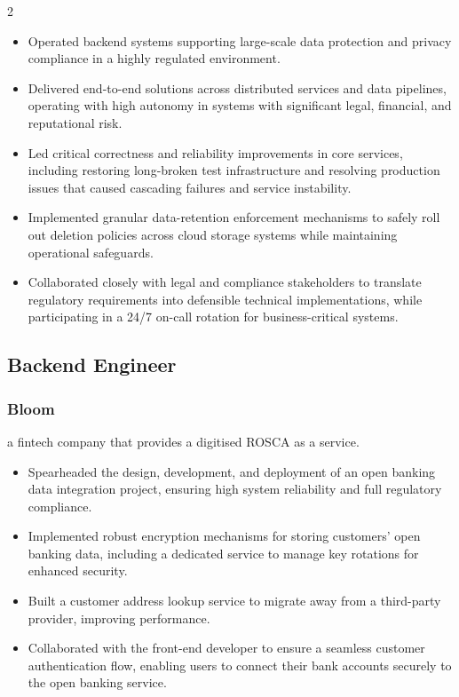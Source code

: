 \documentclass{article}
\begin{document}
\begin{paracol}{2}
  \begin{itemize}[leftmargin=*]
    \setlength\itemsep{-2pt}
    \item Operated backend systems supporting large-scale data protection and privacy compliance in a highly regulated environment.
    \item Delivered end-to-end solutions across distributed services and data pipelines, operating with high autonomy in systems with significant legal, financial, and reputational risk.
    \item Led critical correctness and reliability improvements in core services, including restoring long-broken test infrastructure and resolving production issues that caused cascading failures and service instability.
    \item Implemented granular data-retention enforcement mechanisms to safely roll out deletion policies across cloud storage systems while maintaining operational safeguards.
    \item Collaborated closely with legal and compliance stakeholders to translate regulatory requirements into defensible technical implementations, while participating in a 24/7 on-call rotation for business-critical systems.
  \end{itemize}

  \subsection{Backend Engineer}
  \subsubsection{Bloom}
  {\color{LightGrey}\scriptsize\href{https://www.bloommoney.co}{\faExternalLink}}
  \hspace*{\fill}{\color{TitleGrey}{\scriptsize\faCalendar}\hspace{5pt}{\small09/2023 -- 06/2025}}
  
  {\noindent\small a fintech company that provides a digitised ROSCA as a service.}
  \begin{itemize}[leftmargin=*]
    \setlength\itemsep{-2pt}
    \item Spearheaded the design, development, and deployment of an open banking data integration project, ensuring high system reliability and full regulatory compliance.
    \item Implemented robust encryption mechanisms for storing customers' open banking data, including a dedicated service to manage key rotations for enhanced security.
    \item Built a customer address lookup service to migrate away from a third-party provider, improving performance.
    \item Collaborated with the front-end developer to ensure a seamless customer authentication flow, enabling users to connect their bank accounts securely to the open banking service.
  \end{itemize}


\end{paracol}
\end{document}
